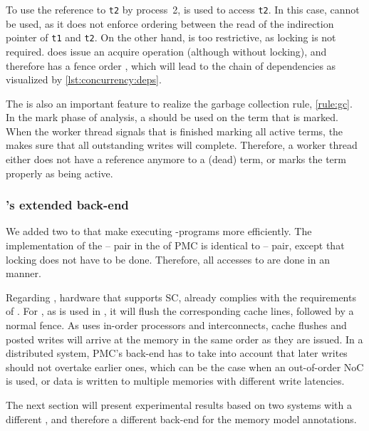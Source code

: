 To use the reference to \lstinline|t2| by process~2,  is used to access \lstinline|t2|.
In this case,  cannot be used, as it does not enforce ordering between the read of the indirection pointer of \lstinline|t1| and \lstinline|t2|.
On the other hand,  is too restrictive, as locking is not required.
 does issue an acquire operation (although without locking), and therefore has a fence order \SYMorderfence, which will lead to the chain of dependencies as visualized by \cref{lst:concurrency:deps}.

The  is also an important feature to realize the garbage collection rule, \cref{rule:gc}.
In the mark phase of  analysis, a  should be used on the term that is marked.
When the worker thread signals that is finished marking all active terms, the  makes sure that all outstanding writes will complete.
Therefore, a worker thread either does not have a reference anymore to a (dead) term, or marks the term properly as being active.

\subsubsection{'s extended back-end}

We added two  to  that make executing \lcalc-programs more efficiently.
The implementation of the -- pair in the  of \ac{PMC} is identical to -- pair, except that locking does not have to be done.
Therefore, all accesses to \lterms are done in an  manner.

Regarding , hardware that supports \acl{SC}, already complies with the requirements of .
For , as is used in \Starburst*, it will flush the corresponding cache lines, followed by a normal fence.
As \Starburst uses in-order processors and interconnects, cache flushes and posted writes will arrive at the memory in the same order as they are issued.
In a distributed system, \ac{PMC}'s back-end has to take into account that later writes should not overtake earlier ones, which can be the case when an out-of-order \ac{NoC} is used, or data is written to multiple memories with different write latencies.

The next section will present experimental results based on two systems with a different , and therefore a different back-end for the memory model annotations.

